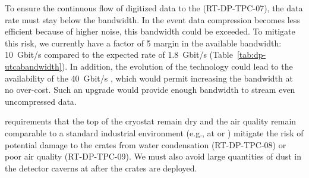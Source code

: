 To ensure the continuous flow of digitized data to the  (RT-DP-TPC-07), the data rate must stay below the  bandwidth. In the event data compression becomes less efficient because of higher noise, this bandwidth could be exceeded. To mitigate this risk, we currently have a factor of \num{5} margin in the available bandwidth: \SI{10}{Gbit/s}  compared to the expected rate of \SI{1.8}{Gbit/s} (Table~\ref{tab:dp-utcabandwidth}). In addition, the evolution of the technology could lead to the availability of the \SI{40}{Gbit/s} , which would permit increasing the bandwidth at no over-cost. Such an upgrade would provide enough bandwidth to stream even uncompressed data.


 requirements that the top of the cryostat remain dry and the air quality remain comparable to a standard industrial environment (e.g., at  or ) mitigate the risk of potential damage to the  crates from water condensation (RT-DP-TPC-08) or poor air quality (RT-DP-TPC-09). We must also avoid large quantities of dust in the detector caverns at  after the  crates are deployed.
